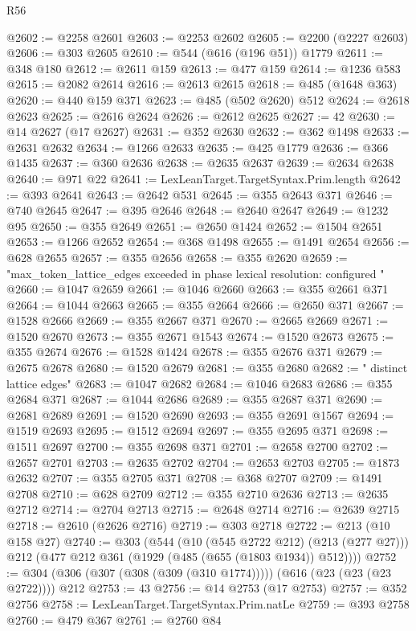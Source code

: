 \begin{lexlean}{R56}
\begin{coremodule}
@2602 := @2258 @2601
@2603 := @2253 @2602
@2605 := @2200 (@2227 @2603)
@2606 := @303 @2605
@2610 := @544 (@616 (@196 @51)) @1779
@2611 := @348 @180
@2612 := @2611 @159
@2613 := @477 @159
@2614 := @1236 @583
@2615 := @2082 @2614
@2616 := @2613 @2615
@2618 := @485 (@1648 @363)
@2620 := @440 @159 @371
@2623 := @485 (@502 @2620) @512
@2624 := @2618 @2623
@2625 := @2616 @2624
@2626 := @2612 @2625
@2627 := 42
@2630 := @14 @2627 (@17 @2627)
@2631 := @352 @2630
@2632 := @362 @1498
@2633 := @2631 @2632
@2634 := @1266 @2633
@2635 := @425 @1779
@2636 := @366 @1435
@2637 := @360 @2636
@2638 := @2635 @2637
@2639 := @2634 @2638
@2640 := @971 @22
@2641 := LexLeanTarget.TargetSyntax.Prim.length
@2642 := @393 @2641
@2643 := @2642 @531
@2645 := @355 @2643 @371
@2646 := @740 @2645
@2647 := @395 @2646
@2648 := @2640 @2647
@2649 := @1232 @95
@2650 := @355 @2649
@2651 := @2650 @1424
@2652 := @1504 @2651
@2653 := @1266 @2652
@2654 := @368 @1498
@2655 := @1491 @2654
@2656 := @628 @2655
@2657 := @355 @2656
@2658 := @355 @2620
@2659 := "max_token_lattice_edges exceeded in phase lexical resolution: configured "
@2660 := @1047 @2659
@2661 := @1046 @2660
@2663 := @355 @2661 @371
@2664 := @1044 @2663
@2665 := @355 @2664
@2666 := @2650 @371
@2667 := @1528 @2666
@2669 := @355 @2667 @371
@2670 := @2665 @2669
@2671 := @1520 @2670
@2673 := @355 @2671 @1543
@2674 := @1520 @2673
@2675 := @355 @2674
@2676 := @1528 @1424
@2678 := @355 @2676 @371
@2679 := @2675 @2678
@2680 := @1520 @2679
@2681 := @355 @2680
@2682 := " distinct lattice edges"
@2683 := @1047 @2682
@2684 := @1046 @2683
@2686 := @355 @2684 @371
@2687 := @1044 @2686
@2689 := @355 @2687 @371
@2690 := @2681 @2689
@2691 := @1520 @2690
@2693 := @355 @2691 @1567
@2694 := @1519 @2693
@2695 := @1512 @2694
@2697 := @355 @2695 @371
@2698 := @1511 @2697
@2700 := @355 @2698 @371
@2701 := @2658 @2700
@2702 := @2657 @2701
@2703 := @2635 @2702
@2704 := @2653 @2703
@2705 := @1873 @2632
@2707 := @355 @2705 @371
@2708 := @368 @2707
@2709 := @1491 @2708
@2710 := @628 @2709
@2712 := @355 @2710 @2636
@2713 := @2635 @2712
@2714 := @2704 @2713
@2715 := @2648 @2714
@2716 := @2639 @2715
@2718 := @2610 (@2626 @2716)
@2719 := @303 @2718
@2722 := @213 (@10 @158 @27)
@2740 := @303
    (@544
      (@10 (@545 @2722 @212) (@213 (@277 @27)))
      @212
      (@477 @212 @361 (@1929 (@485 (@655 (@1803 @1934)) @512))))
@2752 := @304 (@306 (@307 (@308 (@309 (@310 @1774))))) (@616 (@23 (@23 (@23 @2722)))) @212
@2753 := 43
@2756 := @14 @2753 (@17 @2753)
@2757 := @352 @2756
@2758 := LexLeanTarget.TargetSyntax.Prim.natLe
@2759 := @393 @2758
@2760 := @479 @367
@2761 := @2760 @84

\end{coremodule}
\end{lexlean}
